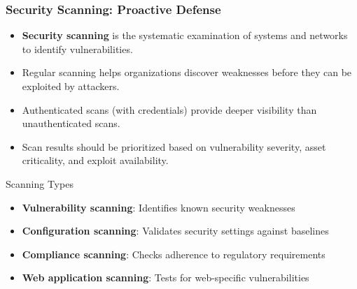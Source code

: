 \documentclass{beamer}
\begin{document}
\begin{frame}
\frametitle{Security Scanning: Proactive Defense}
\begin{itemize}
\item \textbf{Security scanning} is the systematic examination of systems and networks to identify vulnerabilities.
\item Regular scanning helps organizations discover weaknesses before they can be exploited by attackers.
\item Authenticated scans (with credentials) provide deeper visibility than unauthenticated scans.
\item Scan results should be prioritized based on vulnerability severity, asset criticality, and exploit availability.
\end{itemize}

\begin{block}{Scanning Types}
\scriptsize
\begin{itemize}
\item \textbf{Vulnerability scanning}: Identifies known security weaknesses
\item \textbf{Configuration scanning}: Validates security settings against baselines
\item \textbf{Compliance scanning}: Checks adherence to regulatory requirements
\item \textbf{Web application scanning}: Tests for web-specific vulnerabilities
\end{itemize}
\end{block}
\end{frame}
\end{document}
